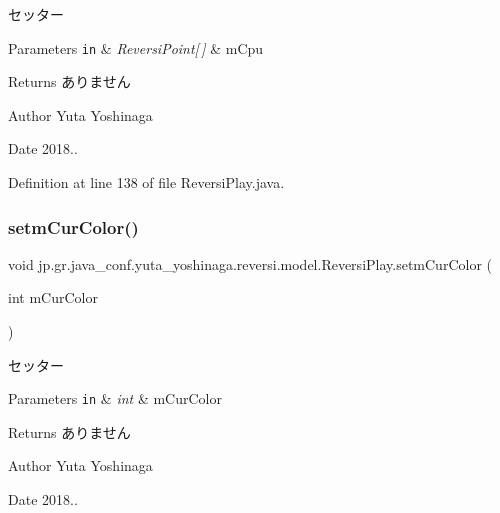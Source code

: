 セッター 


\begin{DoxyParams}[1]{Parameters}
\mbox{\tt in}  & {\em Reversi\+Point\mbox{[}$\,$\mbox{]}} & m\+Cpu \\
\hline
\end{DoxyParams}
\begin{DoxyReturn}{Returns}
ありません 
\end{DoxyReturn}
\begin{DoxyAuthor}{Author}
Yuta Yoshinaga 
\end{DoxyAuthor}
\begin{DoxyDate}{Date}
2018.. 
\end{DoxyDate}


Definition at line 138 of file Reversi\+Play.\+java.

\mbox{\label{classjp_1_1gr_1_1java__conf_1_1yuta__yoshinaga_1_1reversi_1_1model_1_1_reversi_play_a07770f09fda37a6849b941e428c53dcc}} 
\subsubsection{\texorpdfstring{setm\+Cur\+Color()}{setmCurColor()}}
{\footnotesize\ttfamily void jp.\+gr.\+java\+\_\+conf.\+yuta\+\_\+yoshinaga.\+reversi.\+model.\+Reversi\+Play.\+setm\+Cur\+Color (\begin{DoxyParamCaption}\item[{int}]{m\+Cur\+Color }\end{DoxyParamCaption})}



セッター 


\begin{DoxyParams}[1]{Parameters}
\mbox{\tt in}  & {\em int} & m\+Cur\+Color \\
\hline
\end{DoxyParams}
\begin{DoxyReturn}{Returns}
ありません 
\end{DoxyReturn}
\begin{DoxyAuthor}{Author}
Yuta Yoshinaga 
\end{DoxyAuthor}
\begin{DoxyDate}{Date}
2018.. 
\end{DoxyDate}



